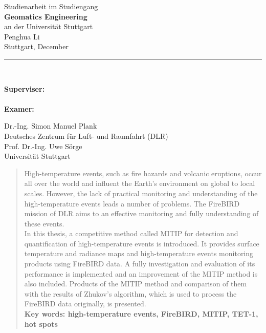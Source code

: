 \documentclass[
12pt, %
english, %
singlespacing, %
headsepline, %
]{MastersThesis} %
\begin{document}
\begin{titlepage}
\begin{minipage}[c][\textheight][t]{\textwidth}
  \Large Studienarbeit im Studiengang\\[2mm]
  \textbf{Geomatics Engineering}\\[2mm]
  an der Universität Stuttgart \\[10mm]
  Penghua Li\\[10mm]
	  Stuttgart, December {\the\year}\\[5mm]
  \rule{\textwidth}{0.5pt}\\[5mm]
  \begin{minipage}{\textwidth}%
  \hfill
  \begin{minipage}[t]{0.13\textwidth}%
  \large\textbf{Superviser:}\\ \\[3mm]%
  \large\textbf{Examer:}
  \end{minipage}
  \quad
  \begin{minipage}[t][3.0cm]{0.7\textwidth}%
    \large Dr.-Ing. Simon Manuel Plank\\
    Deutsches Zentrum für Luft- und Raumfahrt (DLR)\\[3mm]
    Prof. Dr.-Ing. Uwe Sörge\\
    Universität Stuttgart%
  \end{minipage}
  \hfill
  \end{minipage}
\end{minipage}

\end{titlepage}
\restoregeometry
\cleardoublepage

\begin{abstract}
\addchaptertocentry{\abstractname}%
High-temperature events, such as fire hazards and volcanic eruptions, occur all over the world and influent the Earth's environment on global to local scales. However, the lack of practical  monitoring and understanding of the high-temperature events leads a number of problems. The FireBIRD mission of DLR aims to an effective monitoring and fully understanding of these events.\\

\noindent In this thesis, a competitive method called MITIP for detection and quantification of high-temperature events is introduced. It provides surface temperature and radiance maps and high-temperature events monitoring products using FireBIRD data. A fully investigation and evaluation of its performance is implemented and an improvement of the MITIP method is also included. Products of the MITIP method and comparison of them with the results of Zhukov's algorithm, which is used to process the FireBIRD data originally, is presented.\\


\noindent \textbf{Key words: high-temperature events, FireBIRD, MITIP, TET-1, hot spots}
\end{abstract}
\end{document}
